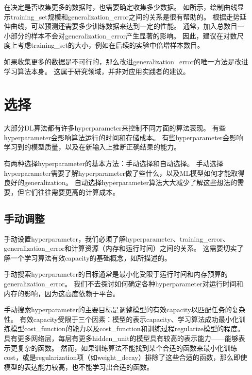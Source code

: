在决定是否收集更多的数据时，也需要确定收集多少数据。
如所示，绘制曲线显示\gls{training_set}规模和\gls{generalization_error}之间的关系是很有帮助的。
根据走势延伸曲线，可以预测还需要多少训练数据来达到一定的性能。
通常，加入总数目一小部分的样本不会对\gls{generalization_error}产生显著的影响。
因此，建议在对数尺度上考虑\gls{training_set}的大小，例如在后续的实验中倍增样本数目。


如果收集更多的数据是不可行的，那么改进\gls{generalization_error}的唯一方法是改进学习算法本身。
这属于研究领域，并非对应用实践者的建议。

\section{选择}
\label{sec:selecting_hyperparameters}
大部分\gls{DL}算法都有许多\gls{hyperparameter}来控制不同方面的算法表现。
有些\gls{hyperparameter}会影响算法运行的时间和存储成本。
有些\gls{hyperparameter}会影响学习到的模型质量，以及在新输入上推断正确结果的能力。


有两种选择\gls{hyperparameter}的基本方法：手动选择和自动选择。
手动选择\gls{hyperparameter}需要了解\gls{hyperparameter}做了些什么，以及\gls{ML}模型如何才能取得良好的\gls{generalization}。
自动选择\gls{hyperparameter}算法大大减少了解这些想法的需要，但它们往往需要更高的计算成本。


\subsection{手动调整}
\label{sec:manual_hyperparameter_tuning}
手动设置\gls{hyperparameter}，我们必须了解\gls{hyperparameter}、\gls{training_error}、\gls{generalization_error}和计算资源（内存和运行时间）之间的关系。
这需要切实了解一个学习算法有效\gls{capacity}的基础概念，如所描述的。


手动搜索\gls{hyperparameter}的目标通常是最小化受限于运行时间和内存预算的\gls{generalization_error}。
我们不去探讨如何确定各种\gls{hyperparameter}对运行时间和内存的影响，因为这高度依赖于平台。


手动搜索\gls{hyperparameter}的主要目标是调整模型的有效\gls{capacity}以匹配任务的复杂性。
有效\gls{capacity}受限于三个因素：模型的表示\gls{capacity}、学习算法成功最小化训练模型\gls{cost_function}的能力以及\gls{cost_function}和训练过程\gls{regularize}模型的程度。
具有更多网络层，每层有更多\gls{hidden_unit}的模型具有较高的表示能力——能够表示更复杂的函数。
然而，如果训练算法不能找到某个合适的函数来最小化训练\gls{cost}，或是\gls{regularization}项（如\gls{weight_decay}）排除了这些合适的函数，那么即使模型的表达能力较高，也不能学习出合适的函数。%

